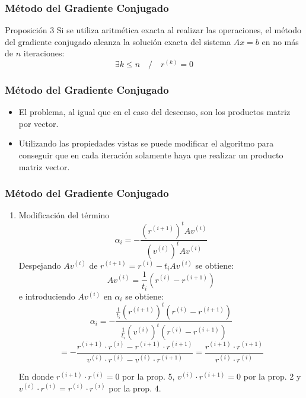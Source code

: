 \documentclass[10pt]{beamer}
\begin{document}
\begin{frame}
  \frametitle{M\'etodo del Gradiente Conjugado}
  \begin{block}{Proposici\'on 3}
    Si se utiliza aritm\'etica exacta al realizar las operaciones, el m\'etodo del gradiente conjugado alcanza la soluci\'on exacta del sistema $Ax = b$ en no m\'as de $n$ iteraciones:
    $$
    \exists k\leq n \quad / \quad r^{(k)}=0
    $$
  \end{block}
\end{frame}
\begin{frame}
  \frametitle{M\'etodo del Gradiente Conjugado}
  \begin{itemize}
    \item El problema, al igual que en el caso del
    descenso, son los productos matriz por vector.
    \item<2-> Utilizando las propiedades vistas se puede modificar el algoritmo para conseguir que en cada iteraci\'on solamente haya que realizar un producto matriz vector.
  \end{itemize}  
\end{frame}
\begin{frame}
  \frametitle{M\'etodo del Gradiente Conjugado}
  \begin{enumerate}
    \item Modificaci\'on del t\'ermino   
   $$
    \alpha_i = -\displaystyle\frac{(r^{(i+1)})^tAv^{(i)}}{(v^{(i)})^tAv^{(i)}}
   $$   
   Despejando $Av^{(i)}$ de $r^{(i+1)} = r^{(i)} - t_iAv^{(i)}$ se obtiene:   
   $$
   Av^{(i)} = \frac{1}{t_i}(r^{(i)}-r^{(i+1)})
   $$   
   e introduciendo $Av^{(i)}$ en $\alpha_i$ se obtiene:
   $$
   \alpha_i = -\frac{\frac{1}{t_i}(r^{(i+1)})^t(r^{(i)}-r^{(i+1)})}{\frac{1}{t_i}(v^{(i)})^t(r^{(i)}-r^{(i+1)})} 
   $$
   $$
= -\frac{r^{(i+1)}\cdot r^{(i)} -r^{(i+1)}\cdot r^{(i+1)} }{v^{(i)}\cdot r^{(i)} -v^{(i)}\cdot r^{(i+1)}} = \frac{r^{(i+1)}\cdot r^{(i+1)}}{r^{(i)}\cdot r^{(i)}}
   $$
   
   En donde $r^{(i+1)}\cdot r^{(i)} = 0$ por la prop. 5, $v^{(i)}\cdot r^{(i+1)}=0$ por la prop. 2 y
   $v^{(i)}\cdot r^{(i)} = r^{(i)}\cdot r^{(i)}$ por la prop. 4.
  \end{enumerate}
\end{frame}
\end{document}
